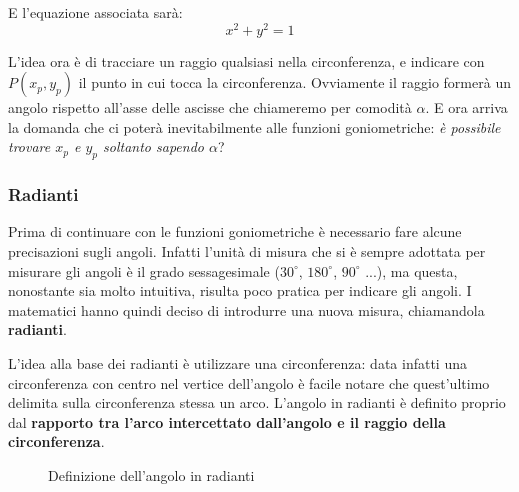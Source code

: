 E l'equazione associata sarà:
\begin{equation*}
    x^2+y^2=1
\end{equation*}

L'idea ora è di tracciare un raggio qualsiasi nella circonferenza, e indicare con $P(x_p, y_p)$ il punto in cui tocca la circonferenza. Ovviamente il raggio formerà un angolo rispetto all'asse delle ascisse che chiameremo per comodità $\alpha$. E ora arriva la domanda che ci poterà inevitabilmente alle funzioni goniometriche: \textit{è possibile trovare $x_p$ e $y_p$ soltanto sapendo $\alpha$}? 

\subsubsection{Radianti}
Prima di continuare con le funzioni goniometriche è necessario fare alcune precisazioni sugli angoli. Infatti l'unità di misura che si è sempre adottata per misurare gli angoli è il grado sessagesimale ($30^\circ$, $180^\circ$, $90^\circ$ ...), ma questa, nonostante sia molto intuitiva, risulta poco pratica per indicare gli angoli. I matematici hanno quindi deciso di introdurre una nuova misura, chiamandola \textbf{radianti}.

L'idea alla base dei radianti è utilizzare una circonferenza: data infatti una circonferenza con centro nel vertice dell'angolo è facile notare che quest'ultimo delimita sulla circonferenza stessa un arco. L'angolo in radianti è definito proprio dal \textbf{rapporto tra l'arco intercettato dall'angolo e il raggio della circonferenza}.



\begin{figure}
	\begin{center}

	\def\myrad{2cm}
	\def\myang{60}


	\end{center}
	\caption{Definizione dell'angolo in radianti}
\end{figure}



